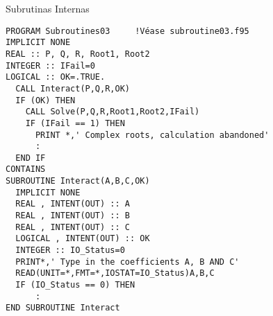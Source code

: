 \begin{frame}[fragile]{Subrutinas Internas}
 \begin{itemize}[<+(0)->]
      \begin{verbatim}
PROGRAM Subroutines03     !Véase subroutine03.f95
IMPLICIT NONE
REAL :: P, Q, R, Root1, Root2
INTEGER :: IFail=0
LOGICAL :: OK=.TRUE.
  CALL Interact(P,Q,R,OK)
  IF (OK) THEN
    CALL Solve(P,Q,R,Root1,Root2,IFail)
    IF (IFail == 1) THEN
      PRINT *,' Complex roots, calculation abandoned'
      :
  END IF    
CONTAINS
SUBROUTINE Interact(A,B,C,OK)
  IMPLICIT NONE
  REAL , INTENT(OUT) :: A
  REAL , INTENT(OUT) :: B
  REAL , INTENT(OUT) :: C
  LOGICAL , INTENT(OUT) :: OK
  INTEGER :: IO_Status=0
  PRINT*,' Type in the coefficients A, B AND C'
  READ(UNIT=*,FMT=*,IOSTAT=IO_Status)A,B,C
  IF (IO_Status == 0) THEN
      :
END SUBROUTINE Interact
      \end{verbatim}
 \end{itemize}
\end{frame}

